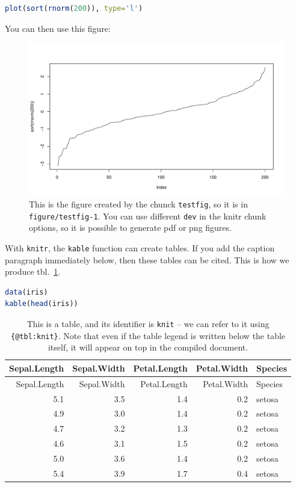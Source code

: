 \documentclass[12pt]{article}
\begin{document}
\begin{lstlisting}[language=R]
plot(sort(rnorm(200)), type='l')
\end{lstlisting}

You can then use this figure:

\begin{figure}
\centering
\includegraphics[width=1.00000\textwidth]{figure/testfig-1.pdf}
\caption{This is the figure created by the chunck \lstinline!testfig!,
so it is in \lstinline!figure/testfig-1!. You can use different
\lstinline!dev! in the knitr chunk options, so it is possible to
generate pdf or png figures.}\label{fig:chunk}
\end{figure}

With \lstinline!knitr!, the \lstinline!kable! function can create
tables. If you add the caption paragraph immediately below, then these
tables can be cited. This is how we produce tbl.~\ref{tbl:knit}.

\begin{lstlisting}[language=R]
data(iris)
kable(head(iris))
\end{lstlisting}

\hypertarget{tbl:knit}{}
\begin{longtable}[]{@{}rrrrl@{}}
\caption{\label{tbl:knit}This is a table, and its identifier is
\lstinline!knit! -- we can refer to it using \lstinline!{@tbl:knit}!.
Note that even if the table legend is written below the table itself, it
will appear on top in the compiled document. }\tabularnewline
\toprule
Sepal.Length & Sepal.Width & Petal.Length & Petal.Width &
Species\tabularnewline
\midrule
\endfirsthead
\toprule
Sepal.Length & Sepal.Width & Petal.Length & Petal.Width &
Species\tabularnewline
\midrule
\endhead
5.1 & 3.5 & 1.4 & 0.2 & setosa\tabularnewline
4.9 & 3.0 & 1.4 & 0.2 & setosa\tabularnewline
4.7 & 3.2 & 1.3 & 0.2 & setosa\tabularnewline
4.6 & 3.1 & 1.5 & 0.2 & setosa\tabularnewline
5.0 & 3.6 & 1.4 & 0.2 & setosa\tabularnewline
5.4 & 3.9 & 1.7 & 0.4 & setosa\tabularnewline
\bottomrule
\end{longtable}
\end{document}
